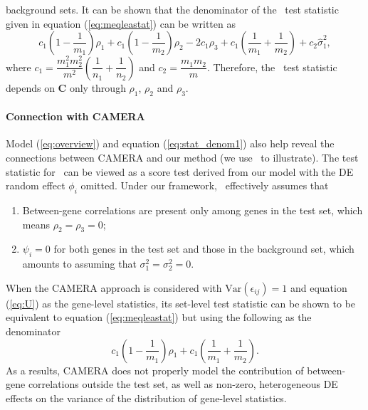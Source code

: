 	background sets. It can be shown that the denominator of the \OurMethod~test statistic given in 
	equation (\ref{eq:meqleastat}) can be written as
	\begin{equation}\label{eq:stat_denom1}
	c_1(1-\dfrac{1}{m_1})\rho_1 + c_1(1-\dfrac{1}{m_2})\rho_2 - 2c_1\rho_3 + 
	c_1(\dfrac{1}{m_1}+\dfrac{1}{m_2})+c_2\hat\sigma_1^2,
	\end{equation}
	where $c_1=\dfrac{m_1^2m_2^2}{m^2}(\dfrac{1}{n_1}+\dfrac{1}{n_2})$ and $c_2=\dfrac{m_1m_2}{m}$. 
	Therefore, the \OurMethod~test statistic depends on $\bm C$ only through $\rho_1$, $\rho_2$ and 
	$\rho_3$. 
	
	\paragraph{Connection with CAMERA}
	Model (\ref{eq:overview})  and equation (\ref{eq:stat_denom1}) also help reveal the 
	connections between CAMERA and our method (we use \CMT~to illustrate). 	
	The test statistic for \CMT~can be viewed as a score test derived from our model with the DE 
	random effect $\phi_i$ omitted. 
	Under our framework, \CMT~effectively assumes that 
	\begin{enumerate}
		\item Between-gene correlations are present only among genes 
		in the test set, which means  $\rho_2=\rho_3=0$;
		\item  $\psi_i=0$ for both genes in the test set and those in the background set, which 
		amounts to assuming that  
		$\sigma_1^2=\sigma_2^2=0$.
	\end{enumerate}
	When the CAMERA approach is considered %
	with 
	$\mbox{Var}(\epsilon_{ij})=1$ and equation (\ref{eq:U}) as the gene-level statistics, its 
	set-level test 
	statistic can be shown to be equivalent to equation (\ref{eq:meqleastat}) but using the 
	following as the denominator
	\begin{equation}\label{eq:stat_denom2}
	c_1(1-\dfrac{1}{m_1})\rho_1 + c_1(\dfrac{1}{m_1}+\dfrac{1}{m_2}).
	\end{equation}
	 As a results, CAMERA does not properly model the contribution of between-gene correlations 
	 outside the test set, as well as non-zero,
	 heterogeneous DE effects on the variance of the distribution of gene-level
	 statistics. 
	 
